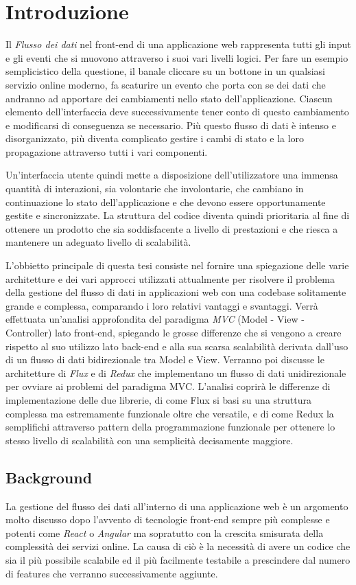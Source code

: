 \chapter{Introduzione}
Il \textit{Flusso dei dati} nel front-end di una applicazione web rappresenta tutti gli input e gli eventi che si muovono attraverso i suoi vari livelli logici. Per fare un esempio semplicistico della questione, il banale cliccare su un bottone in un qualsiasi servizio online moderno, fa scaturire un evento che porta con se dei dati che andranno ad apportare dei cambiamenti nello stato dell'applicazione. Ciascun elemento dell'interfaccia deve successivamente tener conto di questo cambiamento e modificarsi di conseguenza se necessario. Più questo flusso di dati è intenso e disorganizzato, più diventa complicato gestire i cambi di stato e la loro propagazione attraverso tutti i vari componenti.

Un'interfaccia utente quindi mette a disposizione dell'utilizzatore una immensa quantità di interazioni, sia volontarie che involontarie, che cambiano in continuazione lo stato dell'applicazione e che devono essere opportunamente gestite e sincronizzate. La struttura del codice diventa quindi prioritaria al fine di ottenere un prodotto che sia soddisfacente a livello di prestazioni e che riesca a mantenere un adeguato livello di scalabilità.

L'obbietto principale di questa tesi consiste nel fornire una spiegazione delle varie architetture e dei vari approcci utilizzati attualmente per risolvere il problema della gestione del flusso di dati in applicazioni web con una codebase solitamente grande e complessa, comparando i loro relativi vantaggi e svantaggi. Verrà effettuata un'analisi approfondita del paradigma \textit{MVC} (Model - View - Controller) lato front-end, spiegando le grosse differenze che si vengono a creare rispetto al suo utilizzo lato back-end e alla sua scarsa scalabilità derivata dall'uso di un flusso di dati bidirezionale tra Model e View. Verranno poi discusse le architetture di \textit{Flux} e di \textit{Redux} che implementano un flusso di dati unidirezionale per ovviare ai problemi del paradigma MVC.
L'analisi coprirà le differenze di implementazione delle due librerie, di come Flux si basi su una struttura complessa ma estremamente funzionale oltre che versatile, e di come Redux la semplifichi attraverso pattern della programmazione funzionale per ottenere lo stesso livello di scalabilità con una semplicità decisamente maggiore.

\section{Background}
La gestione del flusso dei dati all'interno di una applicazione web è un argomento molto discusso dopo l'avvento di tecnologie front-end sempre più complesse e potenti come \textit{React} o \textit{Angular} ma sopratutto con la crescita smisurata della complessità dei servizi online. La causa di ciò è la necessità di avere un codice che sia il più possibile scalabile ed il più facilmente testabile a prescindere dal numero di features che verranno successivamente aggiunte. 

